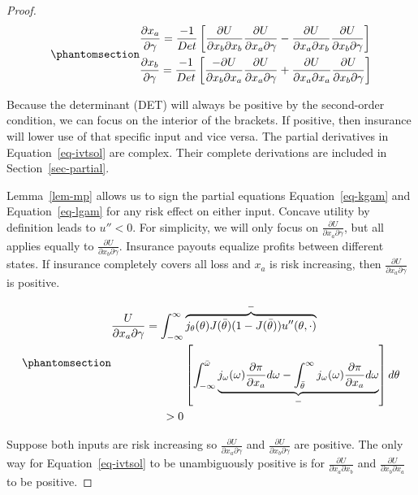 \documentclass[
  letterpaper,
  DIV=11,
  numbers=noendperiod]{scrartcl}
\theoremstyle{plain}
\theoremstyle{plain}
\theoremstyle{remark}
\begin{document}
\begin{proof}
\begin{equation}\phantomsection\label{eq-ivtsol}{
\begin{aligned}
&\frac{\partial x_a}{\partial \gamma}=\frac{-1}{Det}\left[\frac{\partial U}{\partial x_b \partial x_b}\frac{\partial U}{\partial x_a \partial \gamma}-\frac{\partial U}{\partial x_a \partial x_b}\frac{\partial U}{\partial x_b \partial \gamma}\right] \\
&\frac{\partial x_b}{\partial \gamma}=\frac{-1}{Det}\left[\frac{-\partial U}{\partial x_b \partial x_a}\frac{\partial U}{\partial x_a \partial \gamma}+\frac{\partial U}{\partial x_a \partial x_a}\frac{\partial U}{\partial x_b \partial \gamma}\right]
\end{aligned}
}\end{equation}

Because the determinant (DET) will always be positive by the
second-order condition, we can focus on the interior of the brackets. If
positive, then insurance will lower use of that specific input and vice
versa. The partial derivatives in Equation~\ref{eq-ivtsol} are complex.
Their complete derivations are included in Section~\ref{sec-partial}.

Lemma~\ref{lem-mp} allows us to sign the partial equations
Equation~\ref{eq-kgam} and Equation~\ref{eq-lgam} for any risk effect on
either input. Concave utility by definition leads to \(u''<0\). For
simplicity, we will only focus on
\(\frac{\partial U}{\partial x_a\partial \gamma}\), but all applies
equally to \(\frac{\partial U}{\partial x_b\partial \gamma}\). Insurance
payouts equalize profits between different states. If insurance
completely covers all loss and \(x_a\) is risk increasing, then
\(\frac{\partial U}{\partial x_a\partial \gamma}\) is positive.

\begin{equation}\phantomsection\label{eq-kgamsol}{
\begin{aligned}
\frac{U}{\partial x_a \partial \gamma}=\int^{\infty}_{-\infty}&\overbrace{j_{\theta}(\theta)J(\bar\theta)(1-J(\bar\theta))u''(\theta,\cdot)}^{-}\\
&\left[ \int^{\bar\omega}_{-\infty}\underbrace{j_{\omega}(\omega)\frac{\partial \pi}{\partial x_a}d\omega
-\int^{\infty}_{\bar{\theta}}j_{\omega}(\omega)\frac{\partial \pi}{\partial x_a}d\omega}_{-}\right] d\theta\\
>0
\end{aligned}
}\end{equation}

Suppose both inputs are risk increasing so
\(\frac{\partial U}{\partial x_a\partial \gamma}\) and
\(\frac{\partial U}{\partial x_b\partial \gamma}\) are positive. The
only way for Equation~\ref{eq-ivtsol} to be unambiguously positive is
for \(\frac{\partial U}{\partial x_a\partial x_b}\) and
\(\frac{\partial U}{\partial x_b\partial x_a}\) to be positive.


\end{proof}
\end{document}
